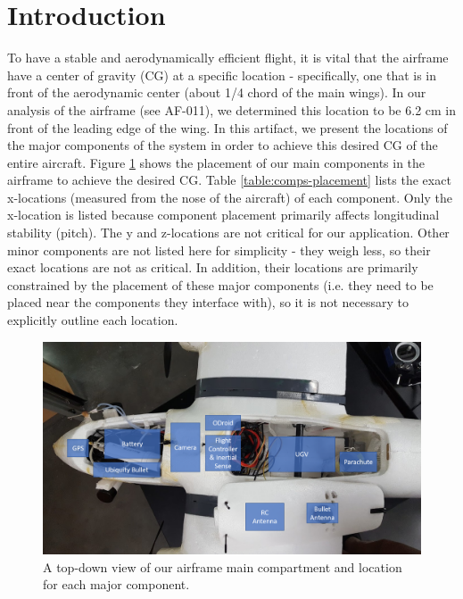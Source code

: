 \documentclass[]{auvsi_doc}
\begin{document}
	\begin{AUVSITitlePage}
		\begin{artifacttable}
		\end{artifacttable}
	\end{AUVSITitlePage}

	\section{Introduction}
	To have a stable and aerodynamically efficient flight, it is vital that the airframe have a center of gravity (CG) at a specific location - specifically, one that is in front of the aerodynamic center (about 1/4 chord of the main wings). In our analysis of the airframe (see AF-011), we determined this location to be 6.2 cm in front of the leading edge of the wing. In this artifact, we present the locations of the major components of the system in order to achieve this desired CG of the entire aircraft. Figure \ref{fig:comps} shows the placement of our main components in the airframe to achieve the desired CG. Table \ref{table:comps-placement} lists the exact x-locations (measured from the nose of the aircraft) of each component. Only the x-location is listed because component placement primarily affects longitudinal stability (pitch). The y and z-locations are not critical for our application. Other minor components are not listed here for simplicity - they weigh less, so their exact locations are not as critical. In addition, their locations are primarily constrained by the placement of these major components (i.e. they need to be placed near the components they interface with), so it is not necessary to explicitly outline each location. 

	\begin{figure}[h!]
		\centering
		\label{fig:comps}
		\includegraphics[width=.9\columnwidth]{comps}
		\caption{A top-down view of our airframe main compartment and location for each major component.}		
	\end{figure}
\end{document}
